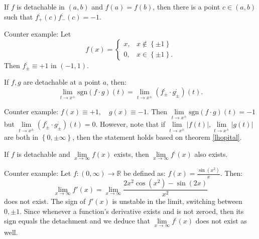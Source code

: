 \documentclass[11pt]{book}
\begin{document}
\begin{exercise}If $f$ is detachable in $\left(a,b\right)$ and $f\left(a\right)=f\left(b\right)$,
then there is a point $c\in\left(a,b\right)$ such that $f_{+}^{;}\left(c\right)f_{-}^{;}\left(c\right)=-1$.
\end{exercise}

Counter example: Let
\[
f\left(x\right)=\begin{cases}
x, & x\notin\left\{ \pm1\right\} \\
0, & x\in\left\{ \pm1\right\} .
\end{cases}
\]
Then $f_{\pm}^{;}\equiv+1$ in $\left(-1,1\right)$.


\begin{exercise}If $f,g$ are detachable at a point $a$, then:
\[
\underset{t\rightarrow x^{\pm}}{\lim}\text{sgn}\left(f\cdot g\right)\left(t\right)=\underset{t\rightarrow x^{\pm}}{\lim}\left(f_{\pm}^{;}\cdot g_{\pm}^{;}\right)\left(t\right).
\]
\end{exercise}

Counter example: $f\left(x\right)\equiv+1,\quad g\left(x\right)\equiv-1$.
Then $\underset{t\rightarrow x^{\pm}}{\lim}\text{sgn}\left(f\cdot g\right)\left(t\right)=-1$
but $\underset{t\rightarrow x^{\pm}}{\lim}\left(f_{\pm}^{;}\cdot g_{\pm}^{;}\right)\left(t\right)=0$.
However, note that if $\underset{t\rightarrow x^{\pm}}{\lim}\left|f\left(t\right)\right|,\underset{t\rightarrow x^{\pm}}{\lim}\left|g\left(t\right)\right|$
are both in $\left\{ 0,\pm\infty\right\} $, then the statement holds
based on theorem \ref{lhopital}.

\begin{exercise}\label{ex_21}If $f$ is detachable and $\underset{x\rightarrow\infty}{\lim}f\left(x\right)$
exists, then $\underset{x\rightarrow\infty}{\lim}f^{;}\left(x\right)$
also exists.
\end{exercise}

Counter example: Let $f:\left(0,\infty\right)\rightarrow\mathbb{R}$
be defined as: $f\left(x\right)=\frac{\sin\left(x^{2}\right)}{x}$.
Then:
\[
\underset{x\rightarrow\infty}{\lim}f'\left(x\right)=\underset{x\rightarrow\infty}{\lim}\frac{2x^{2}\cos\left(x^{2}\right)-\sin\left(2x\right)}{x^{2}}
\]
does not exist. The sign of $f'\left(x\right)$ is unstable
in the limit, switching between $0,\pm1$. Since whenever a function's
derivative exists and is not zeroed, then its sign equals the detachment and
we deduce that $\underset{x\rightarrow\infty}{\lim}f^{;}\left(x\right)$
does not exist as well.
\end{document}

